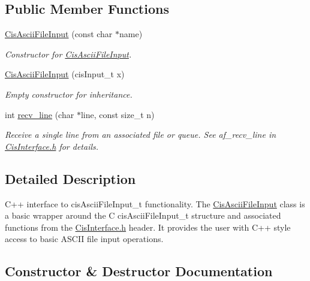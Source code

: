 \subsection*{Public Member Functions}
\begin{DoxyCompactItemize}
\item 
\mbox{\hyperlink{classCisAsciiFileInput_aac31cfe291fe9b5f4dc16bb78a123e8c}{Cis\+Ascii\+File\+Input}} (const char $\ast$name)
\begin{DoxyCompactList}\small\item\em Constructor for \mbox{\hyperlink{classCisAsciiFileInput}{Cis\+Ascii\+File\+Input}}. \end{DoxyCompactList}\item 
\mbox{\label{classCisAsciiFileInput_a7bee575f759ecb42dbe4d525638d5bc1}} 
\mbox{\hyperlink{classCisAsciiFileInput_a7bee575f759ecb42dbe4d525638d5bc1}{Cis\+Ascii\+File\+Input}} (cis\+Input\+\_\+t x)
\begin{DoxyCompactList}\small\item\em Empty constructor for inheritance. \end{DoxyCompactList}\item 
int \mbox{\hyperlink{classCisAsciiFileInput_a4509672e282e82990974104a811c1605}{recv\+\_\+line}} (char $\ast$line, const size\+\_\+t n)
\begin{DoxyCompactList}\small\item\em Receive a single line from an associated file or queue. See af\+\_\+recv\+\_\+line in \mbox{\hyperlink{CisInterface_8h_source}{Cis\+Interface.\+h}} for details. \end{DoxyCompactList}\end{DoxyCompactItemize}


\subsection{Detailed Description}
C++ interface to cis\+Ascii\+File\+Input\+\_\+t functionality. The \mbox{\hyperlink{classCisAsciiFileInput}{Cis\+Ascii\+File\+Input}} class is a basic wrapper around the C cis\+Ascii\+File\+Input\+\_\+t structure and associated functions from the \mbox{\hyperlink{CisInterface_8h_source}{Cis\+Interface.\+h}} header. It provides the user with C++ style access to basic A\+S\+C\+II file input operations. 

\subsection{Constructor \& Destructor Documentation}
\mbox{\label{classCisAsciiFileInput_aac31cfe291fe9b5f4dc16bb78a123e8c}} 
